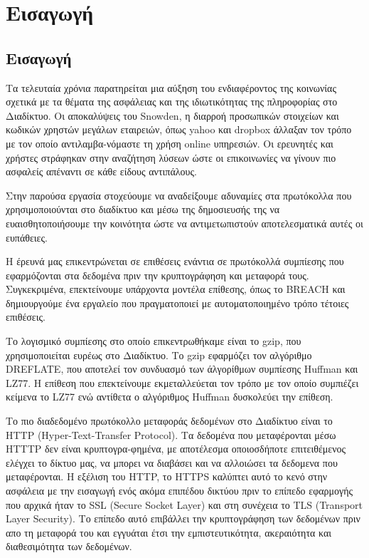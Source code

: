 \chapter{Εισαγωγή}\label{ch:intro}

\section{Εισαγωγή}\label{sec:intro}

Τα τελευταία χρόνια παρατηρείται μια αύξηση του ενδιαφέροντος της κοινωνίας
σχετικά με τα θέματα της ασφάλειας και της ιδιωτικότητας της πληροφορίας στο
Διαδίκτυο. Οι αποκαλύψεις του Snowden, η διαρροή προσωπικών στοιχείων και
κωδικών χρηστών μεγάλων εταιρειών, όπως yahoo και dropbox άλλαξαν τον τρόπο
με τον οποίο αντιλαμβα-νόμαστε τη χρήση online υπηρεσιών. Οι ερευνητές και
χρήστες στράφηκαν στην αναζήτηση λύσεων ώστε οι επικοινωνίες να γίνουν πιο
ασφαλείς απέναντι σε κάθε είδους αντιπάλους.

Στην παρούσα εργασία στοχεύουμε να αναδείξουμε αδυναμίες στα πρωτόκολλα
που χρησιμοποιούνται στο διαδίκτυο και μέσω της δημοσιευσής της να 
ευαισθητοποιήσουμε την κοινότητα ώστε να αντιμετωπιστούν αποτελεσματικά αυτές
οι ευπάθειες.

Η έρευνά μας επικεντρώνεται σε επιθέσεις ενάντια σε πρωτόκολλά συμπίεσης που
εφαρμόζονται στα δεδομένα πριν την κρυπτογράφηση και μεταφορά τους. Συγκεκριμένα,
επεκτείνουμε υπάρχοντα μοντέλα επίθεσης, όπως το BREACH και δημιουργούμε ένα εργαλείο
που πραγματοποιεί με αυτοματοποιημένο τρόπο τέτοιες επιθέσεις.

Το λογισμικό συμπίεσης στο οποίο επικεντρωθήκαμε είναι το gzip, που 
χρησιμοποιείται ευρέως στο Διαδίκτυο. Το gzip εφαρμόζει τον αλγόριθμο
DREFLATE, που αποτελεί τον συνδυασμό των άλγορίθμων συμπίεσης Huffman
και LZ77. Η επίθεση που επεκτείνουμε εκμεταλλεύεται τον τρόπο με τον
οποίο συμπιέζει κείμενα το LZ77 ενώ αντίθετα ο αλγόριθμος Huffman
δυσκολεύει την επίθεση.

Το πιο διαδεδομένο πρωτόκολλο μεταφοράς δεδομένων στο Διαδίκτυο είναι το
HTTP (Hyper-Text-Transfer Protocol). Τα δεδομένα που μεταφέρονται μέσω HTTTP
δεν είναι κρυπτογρα-φημένα, με αποτέλεσμα οποιοσδήποτε επιτειθέμενος ελέγχει
το δίκτυο μας, να μπορει να διαβάσει και να αλλοιώσει τα δεδομενα που μεταφέρονται.
Η εξέλιση του HTTP, το HTTPS καλύπτει αυτό το κενό στην ασφάλεια με την εισαγωγή
ενός ακόμα επιπέδου δικτύου πριν το επίπεδο εφαρμογής που αρχικά ήταν το SSL 
(Secure Socket Layer) και στη συνέχεια το TLS (Transport Layer Security). Το επίπεδο αυτό
επιβάλλει την κρυπτογράφηση των δεδομένων πριν  απο τη μεταφορά του και εγγυάται
έτσι την εμπιστευτικότητα, ακεραιότητα και διαθεσιμότητα των δεδομένων.

